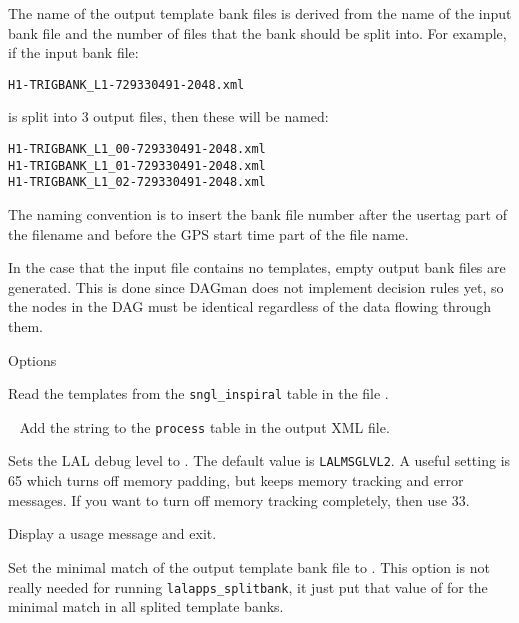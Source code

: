 \begin{entry}
The name of the output template bank files is derived from the name of 
the input bank file and the number of files that the bank should be split
into. For example, if the input bank file:\\
\begin{center}
\texttt{H1-TRIGBANK\_L1-729330491-2048.xml}\\
\end{center}
is split into 3 output files, then these will be named:\\
\begin{center}
\texttt{H1-TRIGBANK\_L1\_00-729330491-2048.xml}\\
\texttt{H1-TRIGBANK\_L1\_01-729330491-2048.xml}\\
\texttt{H1-TRIGBANK\_L1\_02-729330491-2048.xml}\\
\end{center}
The naming convention is to insert the bank file number after the usertag part
of the filename and before the GPS start time part of the file name.

In the case that the input file contains no templates, empty output bank files
are generated. This is done since DAGman does not implement decision rules
yet, so the nodes in the DAG must be identical regardless of the data flowing
through them.

\item[Options]\leavevmode
\begin{entry}

\item[\option{--bank-file} \parm{file}] 
Read the templates from the \texttt{sngl\_inspiral} table in the file .

\item[ \option{--comment}~\parm{comment}]
Add the string  to the \verb$process$ table in the output XML file.

\item[\option{--debug-level} \parm{level}]
Sets the LAL debug level to .  The default value is
\texttt{LALMSGLVL2}.  A useful setting is 65 which turns off memory
padding, but keeps memory tracking and error messages.  If you want to turn
off memory tracking completely, then use 33.

\item[\option{--help}]
Display a usage message and exit.

\item[\option{--minimal-match} \parm{m}] 
Set the minimal match of the output template bank file to .
This option is not really needed for running \verb$lalapps_splitbank$, it just put that value of  for the minimal match in all splited template banks.


\end{entry}
\end{entry}

